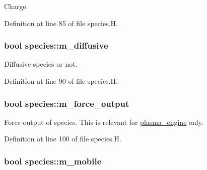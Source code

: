 Charge. 



Definition at line 85 of file species.\+H.

\subsubsection[{\texorpdfstring{m\+\_\+diffusive}{m_diffusive}}]{\setlength{\rightskip}{0pt plus 5cm}bool species\+::m\+\_\+diffusive\hspace{0.3cm}{\ttfamily [protected]}}\hypertarget{classspecies_aa90618b29da89992614e956b03b57a9b}{}\label{classspecies_aa90618b29da89992614e956b03b57a9b}


Diffusive species or not. 



Definition at line 90 of file species.\+H.

\subsubsection[{\texorpdfstring{m\+\_\+force\+\_\+output}{m_force_output}}]{\setlength{\rightskip}{0pt plus 5cm}bool species\+::m\+\_\+force\+\_\+output\hspace{0.3cm}{\ttfamily [protected]}}\hypertarget{classspecies_ae2426a6b34439c3b7e2432d09361a518}{}\label{classspecies_ae2426a6b34439c3b7e2432d09361a518}


Force output of species. This is relevant for \hyperlink{classplasma__engine}{plasma\+\_\+engine} only. 



Definition at line 100 of file species.\+H.

\subsubsection[{\texorpdfstring{m\+\_\+mobile}{m_mobile}}]{\setlength{\rightskip}{0pt plus 5cm}bool species\+::m\+\_\+mobile\hspace{0.3cm}{\ttfamily [protected]}}\hypertarget{classspecies_ac319022ed7974425b7089fd131c0667d}{}\label{classspecies_ac319022ed7974425b7089fd131c0667d}


